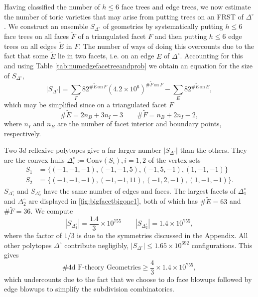 \documentclass[aps,prl,twocolumn, superscriptaddress,groupedaddress,nofootinbib]{revtex4-1}
\newcommand{\sdoc}{S_{\Delta_1^\circ}}
\newcommand{\sdtc}{S_{\Delta_2^\circ}}
\begin{document}
\vspace{.5cm}
Having classified the number of $h\leq 6$ face trees and edge trees, we now estimate 
the number of toric varieties that may arise from putting trees on an FRST of 
$\Delta^\circ$. 
We construct an ensemble $S_{\Delta^\circ}$ of geometries by systematically putting $h\leq 6$ face trees on all
faces $\tilde F$ of a triangulated facet $F$ and then putting $h\leq 6$ edge trees on
all edges $\tilde E$ in $F$. The number of ways of doing this overcounts
due to the fact that some
$\tilde E$ lie in two facets, i.e. on an edge $E$ of $\Delta^\circ$. Accounting
for this and using Table \ref{tab:numedgefacetreeandprob} we obtain an equation for the size of $S_{\Delta^\circ},$
\begin{equation}
|S_{\Delta^\circ}| = \sum_F 82^{\# \tilde E \, \text{on} \, F} (4.2\times 10^6)^{\# \tilde F \, \text{on} \, F} - \sum_E 82^{\# \tilde E \, \text{on} \, E}, \nonumber
\end{equation}
which may be simplified since on a triangulated facet $F$
\begin{equation}
\#\tilde E = 2n_B + 3n_I - 3 \qquad \# \tilde F = n_B+2n_I-2,
\end{equation}
where $n_I$ and $n_B$ are the number of facet interior and boundary points,
respectively. 

Two $3d$ reflexive polytopes give a far larger number $|S_{\Delta^\circ}|$
than the others. They
are  the convex hulls $\Delta_i^\circ := \text{Conv}(S_i), i=1,2$ of the
vertex sets
\begin{align} 
S_1 &= \{ (-1,-1,-1),(-1,-1,5),(-1,5,-1),(1,-1,-1)\} \nonumber \\
S_2 &= \{ (-1,-1,-1),(-1,-1,11),(-1,2,-1),(1,-1,-1)\}. \nonumber
\end{align}
$\sdoc$ and $\sdtc$ have the same number of edges and faces. 
The largest facets of $\Delta_1^\circ$ and $\Delta_2^\circ$ are displayed in \ref{fig:bigfacetbigone1}, 
both of which has $\# \tilde E = 63$ and $\# \tilde F=36$. We compute
\begin{equation}
|\sdoc| = \frac{1.4}{3} \times 10^{755} \qquad |\sdtc| = 1.4 \times 10^{755},
\label{eqn:sdocsdtccounts}
\end{equation}
where the factor of $1/3$ is due to the symmetries discussed in the Appendix.
All other polytopes $\Delta^\circ$ contribute negligibly, 
$|S_{\Delta^\circ}| \leq 1.65\times 10^{692}$
configurations. This gives
\begin{equation}
\text{\# 4d F-theory Geometries} \geq \frac43 \times 1.4 \times 10^{755},
\end{equation}
which undercounts due to the fact that we choose to do face blowups followed by
edge blowups to simplify the subdivision combinatorics. %
\end{document}
